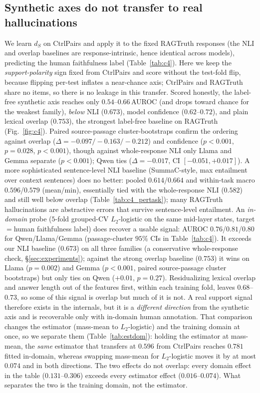 \subsection{Synthetic axes do not transfer to real hallucinations}
\label{sec:c4}
We learn $d_S$ on CtrlPairs and apply it to the fixed RAGTruth responses (the NLI and
overlap baselines are response-intrinsic, hence identical across models), predicting the
human faithfulness label (Table~\ref{tab:c4}). Here we keep the
\emph{support-polarity} sign fixed from CtrlPairs and score without the
test-fold flip, because flipping per-test inflates a near-chance axis; CtrlPairs
and RAGTruth share no items, so there is no leakage in this transfer. Scored
honestly, the label-free synthetic axis reaches only $0.54$--$0.66$\,AUROC
(and drops toward chance for the weakest family), \emph{below} NLI ($0.673$),
model confidence ($0.62$--$0.72$), and plain lexical overlap ($0.753$), the
strongest label-free baseline on RAGTruth (Fig.~\ref{fig:c4}). Paired source-passage cluster-bootstraps confirm the
ordering against overlap ($\Delta{=}{-}0.097/{-}0.163/{-}0.212$) and confidence
($p{<}0.001$, $p{=}0.028$, $p{<}0.001$), though against whole-response NLI only Llama and Gemma separate
($p{<}0.001$); Qwen ties ($\Delta{=}{-}0.017$, CI $[-0.051,+0.017]$).
A more sophisticated sentence-level NLI baseline (SummaC-style, max entailment over
context sentences) does no better: pooled $0.614$/$0.664$ and within-task macro
$0.596$/$0.579$ (mean/min), essentially tied with the whole-response NLI ($0.582$) and
still well below overlap (Table~\ref{tab:c4_pertask}); many RAGTruth hallucinations are
abstractive errors that survive sentence-level entailment.
An \emph{in-domain} probe ($5$-fold grouped-CV $L_2$-logistic on the same mid-layer
states, target${=}$human faithfulness label) does recover a usable signal:
AUROC $0.76$/$0.81$/$0.80$ for Qwen/Llama/Gemma (passage-cluster $95\%$ CIs in
Table~\ref{tab:c4}). It exceeds our NLI baseline ($0.673$) on all three families (a conservative
whole-response check, \S\ref{sec:experiments}); against the strong overlap
baseline ($0.753$) it wins on Llama ($p{=}0.002$) and Gemma ($p{<}0.001$, paired
source-passage cluster bootstraps) but only ties on Qwen ($+0.01$, $p{=}0.27$). Residualizing lexical overlap and answer length out of the
features first, within each training fold, leaves $0.68$--$0.73$, so some of this signal
is overlap but much of it is not. A
real support signal therefore exists in the internals, but it is a \emph{different
direction} from the synthetic axis and is recoverable only with in-domain human
annotation. That comparison changes the estimator (mass-mean to $L_2$-logistic) and the
training domain at once, so we separate them (Table~\ref{tab:estdom}): holding the
estimator at mass-mean, the \emph{same} estimator that transfers at $0.596$ from
CtrlPairs reaches $0.781$ fitted in-domain, whereas swapping mass-mean for
$L_2$-logistic moves it by at most $0.074$ and in both directions. The two effects do
not overlap: every domain effect in the table ($0.131$--$0.306$) exceeds every estimator
effect ($0.016$--$0.074$). What separates the two is the training domain, not the
estimator.

